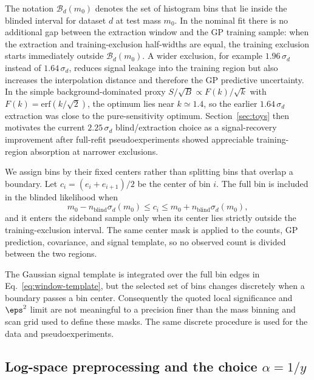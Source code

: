 The notation $\mathcal{B}_d(m_0)$ denotes the set of histogram bins that lie inside the
blinded interval for dataset $d$ at test mass $m_0$. In the nominal fit there is no
additional gap between the extraction window and the GP
training sample: when the extraction and training-exclusion half-widths are equal, the
training exclusion starts immediately outside $\mathcal{B}_d(m_0)$. A wider exclusion,
for example $1.96\,\sigma_d$ instead of $1.64\,\sigma_d$, reduces signal leakage into
the training region but also increases the interpolation distance and therefore the GP
predictive uncertainty. In the simple background-dominated proxy
$S/\sqrt{B}\propto F(k)/\sqrt{k}$ with $F(k)=\mathrm{erf}(k/\sqrt{2})$, the optimum lies
near $k\simeq1.4$, so the earlier $1.64\,\sigma_d$ extraction was close to the
pure-sensitivity optimum. Section~\ref{sec:toys} then motivates the current
$2.25\,\sigma_d$ blind/extraction choice as a signal-recovery improvement after
full-refit pseudoexperiments showed appreciable training-region absorption at narrower
exclusions.

We assign bins by their fixed centers rather than splitting bins that overlap a
boundary. Let $c_i=(e_i+e_{i+1})/2$ be the center of bin $i$. The full
bin is included in the blinded likelihood when
\begin{equation}
m_0-n_{\mathrm{blind}}\sigma_d(m_0)
\le c_i \le
m_0+n_{\mathrm{blind}}\sigma_d(m_0),
\end{equation}
and it enters the sideband sample only when its center lies strictly outside the
training-exclusion interval. The same center mask is applied to the counts, GP
prediction, covariance, and signal template, so no observed count is divided between
the two regions.

The Gaussian signal template is integrated over the full bin edges in
Eq.~\eqref{eq:window-template}, but the selected set of bins changes discretely when a
boundary passes a bin center. Consequently the quoted local significance and
$\eps^2$ limit are not meaningful to a precision finer than the mass binning and scan
grid used to define these masks. The same discrete procedure is used for the data and
pseudoexperiments.

\subsection{Log-space preprocessing and the choice \texorpdfstring{$\alpha=1/y$}{alpha=1/y}}

